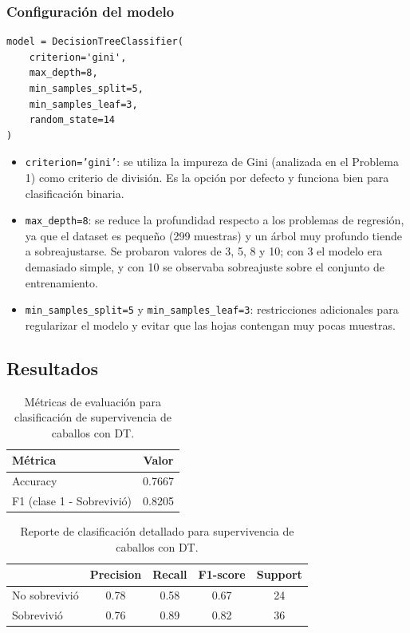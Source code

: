\documentclass{article}
\begin{document}
\subsubsection{Configuración del modelo}

\begin{lstlisting}
model = DecisionTreeClassifier(
    criterion='gini',
    max_depth=8,
    min_samples_split=5,
    min_samples_leaf=3,
    random_state=14
)
\end{lstlisting}

\begin{itemize}
    \item \texttt{criterion='gini'}: se utiliza la impureza de Gini (analizada en el Problema 1) como criterio de división. Es la opción por defecto y funciona bien para clasificación binaria.
    \item \texttt{max\_depth=8}: se reduce la profundidad respecto a los problemas de regresión, ya que el dataset es pequeño (299 muestras) y un árbol muy profundo tiende a sobreajustarse. Se probaron valores de 3, 5, 8 y 10; con 3 el modelo era demasiado simple, y con 10 se observaba sobreajuste sobre el conjunto de entrenamiento.
    \item \texttt{min\_samples\_split=5} y \texttt{min\_samples\_leaf=3}: restricciones adicionales para regularizar el modelo y evitar que las hojas contengan muy pocas muestras.
\end{itemize}

\subsection{Resultados}

\begin{table}[H]
\centering
\begin{tabular}{lc}
\hline
\textbf{Métrica} & \textbf{Valor} \\
\hline
Accuracy & 0.7667 \\
F1 (clase 1 - Sobrevivió) & 0.8205 \\
\hline
\end{tabular}
\caption{Métricas de evaluación para clasificación de supervivencia de caballos con DT.}
\label{tab:p5_resultados}
\end{table}

\begin{table}[H]
\centering
\begin{tabular}{lcccc}
\hline
& \textbf{Precision} & \textbf{Recall} & \textbf{F1-score} & \textbf{Support} \\
\hline
No sobrevivió & 0.78 & 0.58 & 0.67 & 24 \\
Sobrevivió    & 0.76 & 0.89 & 0.82 & 36 \\
\hline
\end{tabular}
\caption{Reporte de clasificación detallado para supervivencia de caballos con DT.}
\label{tab:p5_report}
\end{table}
\end{document}
